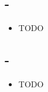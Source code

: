 \documentclass[a4paper,10pt,titlepage]{article}
\begin{document}
\begin{itemize}
\end{itemize}

\subsection*{-}

\begin{itemize}
\item
TODO
\end{itemize}

\subsection*{-}

\begin{itemize}
\item
TODO
\end{itemize}
\end{document}
